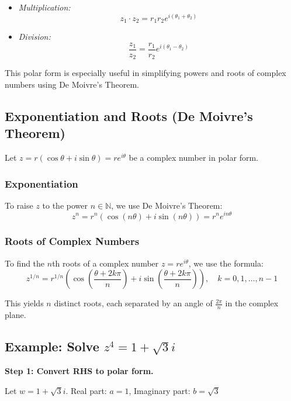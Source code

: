 \begin{itemize}[label=\(-\)]
	\item \emph{Multiplication:}
	      \[
		      z_1 \cdot z_2 = r_1 r_2 e^{i(\theta_1 + \theta_2)}
	      \]

	\item \emph{Division:}
	      \[
		      \frac{z_1}{z_2} = \frac{r_1}{r_2} e^{i(\theta_1 - \theta_2)}
	      \]
\end{itemize}

This polar form is especially useful in simplifying powers and roots of complex numbers using De Moivre’s Theorem.

\subsection{Exponentiation and Roots (De Moivre's Theorem)}

Let \( z = r(\cos \theta + i \sin \theta) = re^{i\theta} \) be a complex number in polar form.

\subsubsection{Exponentiation}

To raise \( z \) to the power \( n \in \mathbb{N} \), we use De Moivre’s Theorem:
\[
	z^n = r^n (\cos(n\theta) + i \sin(n\theta)) = r^n e^{in\theta}
\]

\subsubsection{Roots of Complex Numbers}

To find the \( n \)th roots of a complex number \( z = r e^{i\theta} \), we use the formula:
\[
	z^{1/n} = r^{1/n} \left( \cos\left( \frac{\theta + 2k\pi}{n} \right) + i \sin\left( \frac{\theta + 2k\pi}{n} \right) \right), \quad k = 0, 1, \ldots, n-1
\]

This yields \( n \) distinct roots, each separated by an angle of \( \frac{2\pi}{n} \) in the complex plane.

\subsection{Example: Solve \texorpdfstring{\( z^4 = 1 + \sqrt{3}i \)}{}}

\textbf{Step 1: Convert RHS to polar form.}

Let \( w = 1 + \sqrt{3}i \).
Real part: \( a = 1 \), Imaginary part: \( b = \sqrt{3} \)

